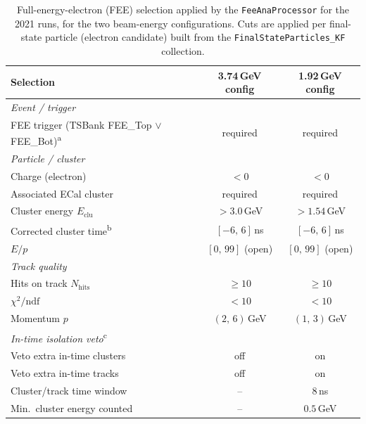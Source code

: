 \begin{table}[htbp]
  \centering
  \caption{Full-energy-electron (FEE) selection applied by the \texttt{FeeAnaProcessor}
           for the 2021 runs, for the two beam-energy configurations. Cuts are applied
           per final-state particle (electron candidate) built from the
           \texttt{FinalStateParticles\_KF} collection.}
  \label{tab:fee_selection}
  \begin{tabular}{lcc}
    \toprule
    Selection & 3.74\,GeV config & 1.92\,GeV config \\
    \midrule
    \multicolumn{3}{l}{\textit{Event / trigger}} \\
    FEE trigger (TSBank FEE\_Top $\lor$ FEE\_Bot)\textsuperscript{a} & required & required \\
    \midrule
    \multicolumn{3}{l}{\textit{Particle / cluster}} \\
    Charge (electron)                       & $< 0$            & $< 0$ \\
    Associated ECal cluster                 & required         & required \\
    Cluster energy $E_{\mathrm{clu}}$       & $> 3.0$\,GeV      & $> 1.54$\,GeV \\
    Corrected cluster time\textsuperscript{b} & $[-6,\,6]$\,ns & $[-6,\,6]$\,ns \\
    $E/p$                                   & $[0,\,99]$ (open) & $[0,\,99]$ (open) \\
    \midrule
    \multicolumn{3}{l}{\textit{Track quality}} \\
    Hits on track $N_{\mathrm{hits}}$       & $\geq 10$        & $\geq 10$ \\
    $\chi^2/\mathrm{ndf}$                    & $< 10$           & $< 10$ \\
    Momentum $p$                            & $(2,\,6)$\,GeV    & $(1,\,3)$\,GeV \\
    \midrule
    \multicolumn{3}{l}{\textit{In-time isolation veto}\textsuperscript{c}} \\
    Veto extra in-time clusters             & off              & on \\
    Veto extra in-time tracks               & off              & on \\
    Cluster/track time window               & --               & $8$\,ns \\
    Min.\ cluster energy counted            & --               & $0.5$\,GeV \\
    \bottomrule
  \end{tabular}


\end{table}
